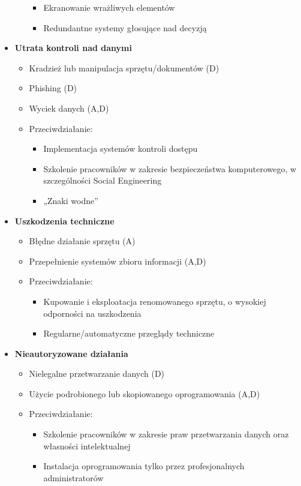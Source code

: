 \begin{itemize}
\begin{itemize}
\begin{itemize}
			\item Ekranowanie wrażliwych elementów
			\item Redundantne systemy głosujące nad decyzją
		\end{itemize}
	\end{itemize}
	\item \textbf{Utrata kontroli nad danymi}
	\begin{itemize}
		\item Kradzież lub manipulacja sprzętu/dokumentów (D)
		\item Phishing (D)
		\item Wyciek danych (A,D)
		\item Przeciwdziałanie:
		\begin{itemize}
			\item Implementacja systemów kontroli dostępu
			\item Szkolenie pracowników w zakresie bezpieczeństwa komputerowego, w szczególności Social Engineering
			\item „Znaki wodne”
		\end{itemize}
	\end{itemize}
	\item \textbf{Uszkodzenia techniczne}
	\begin{itemize}
		\item Błędne działanie sprzętu (A)
		\item Przepełnienie systemów zbioru informacji (A,D)
		\item Przeciwdziałanie:
		\begin{itemize}
			\item Kupowanie i eksploatacja renomowanego sprzętu, o wysokiej odporności na uszkodzenia
			\item Regularne/automatyczne przeglądy techniczne
		\end{itemize}
	\end{itemize}
	\item \textbf{Nieautoryzowane działania}
	\begin{itemize}
		\item Nielegalne przetwarzanie danych (D)
		\item Użycie podrobionego lub skopiowanego oprogramowania (A,D)
		\item Przeciwdziałanie:
		\begin{itemize}
			\item Szkolenie pracowników w zakresie praw przetwarzania danych oraz własności intelektualnej
			\item Instalacja oprogramowania tylko przez profesjonalnych administratorów

\end{itemize}
\end{itemize}
\end{itemize}
